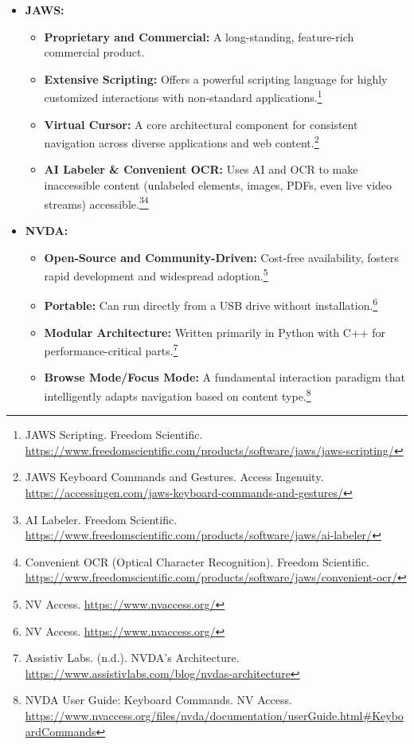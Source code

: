\begin{itemize}[leftmargin=*,noitemsep,topsep=0pt]
    \item \textbf{JAWS:}
    \begin{itemize}[leftmargin=*,noitemsep,topsep=0pt]
        \item \textbf{Proprietary and Commercial:} A long-standing, feature-rich commercial product.
        \item \textbf{Extensive Scripting:} Offers a powerful scripting language for highly customized interactions with non-standard applications.\footnote{JAWS Scripting. Freedom Scientific. \url{https://www.freedomscientific.com/products/software/jaws/jaws-scripting/}}
        \item \textbf{Virtual Cursor:} A core architectural component for consistent navigation across diverse applications and web content.\footnote{JAWS Keyboard Commands and Gestures. Access Ingenuity. \url{https://accessingen.com/jaws-keyboard-commands-and-gestures/}}
        \item \textbf{AI Labeler \& Convenient OCR:} Uses AI and OCR to make inaccessible content (unlabeled elements, images, PDFs, even live video streams) accessible.\footnote{AI Labeler. Freedom Scientific. \url{https://www.freedomscientific.com/products/software/jaws/ai-labeler/}}\footnote{Convenient OCR (Optical Character Recognition). Freedom Scientific. \url{https://www.freedomscientific.com/products/software/jaws/convenient-ocr/}}
    \end{itemize}
    \item \textbf{NVDA:}
    \begin{itemize}[leftmargin=*,noitemsep,topsep=0pt]
        \item \textbf{Open-Source and Community-Driven:} Cost-free availability, fosters rapid development and widespread adoption.\footnote{NV Access. \url{https://www.nvaccess.org/}}
        \item \textbf{Portable:} Can run directly from a USB drive without installation.\footnote{NV Access. \url{https://www.nvaccess.org/}}
        \item \textbf{Modular Architecture:} Written primarily in Python with C++ for performance-critical parts.\footnote{Assistiv Labs. (n.d.). NVDA's Architecture. \url{https://www.assistivlabs.com/blog/nvdas-architecture}}
        \item \textbf{Browse Mode/Focus Mode:} A fundamental interaction paradigm that intelligently adapts navigation based on content type.\footnote{NVDA User Guide: Keyboard Commands. NV Access. \url{https://www.nvaccess.org/files/nvda/documentation/userGuide.html#KeyboardCommands}}

\end{itemize}
\end{itemize}
